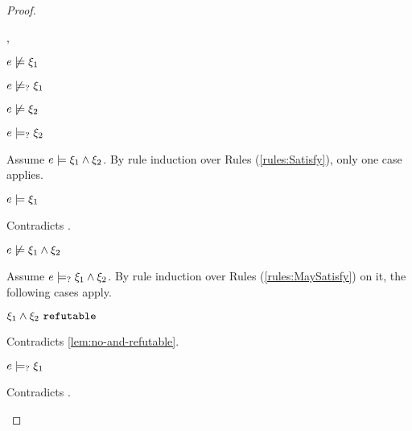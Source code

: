 \begin{proof}
\begin{byCases}
\begin{byCases}
    \item[\cnotsatisfyormay{e}{\xi_1},\cmaysatisfy{e}{\xi_2}]
        \begin{pfsteps*}
        \item $e \not\models \xi_1$  
        \item $e \not\models_{?} \xi_1$  
        \item $e \not\models \xi_2$  
        \item $e \models_{?} \xi_2$  
        \end{pfsteps*}
        Assume $e \models \xi_1 \wedge \xi_2$. By rule induction over Rules (\ref{rules:Satisfy}), only one case applies.
        \begin{byCases}
        \item[\text{(\ref{rule:CSAnd})}]
            \begin{pfsteps*}
            \item $e \models \xi_1$ 
            \end{pfsteps*}
            Contradicts .
        \end{byCases}
        \begin{pfsteps*}
        \item $e \not\models \xi_1 \wedge \xi_2$  
        \end{pfsteps*}
        Assume $e \models_{?} \xi_1 \wedge \xi_2$. By rule induction over Rules (\ref{rules:MaySatisfy}) on it, the following cases apply.
        \begin{byCases}
        \item[\text{(\ref{rule:CMSNotVal})}]
            \begin{pfsteps*}
            \item $\xi_1 \wedge \xi_2 ~\mathtt{refutable}$ 
            \end{pfsteps*}
            Contradicts \autoref{lem:no-and-refutable}.
        \item[\text{(\ref{rule:CMSAnd1})}]
            \begin{pfsteps*}
            \item $e \models_{?} \xi_1$ 
            \end{pfsteps*}
            Contradicts .

\end{byCases}
\end{byCases}
\end{byCases}
\end{proof}
